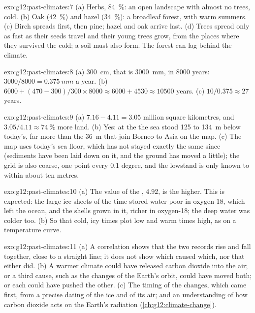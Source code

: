 \begin{solution}{exo:g12:past-climates:7}
(a) Herbs, \qty{84}{\percent}: an open landscape with almost no trees, cold.
(b) Oak (\qty{42}{\percent}) and hazel (\qty{34}{\percent}): a broadleaf
forest, with warm summers. (c) Birch spreads first, then pine; hazel and oak
arrive last. (d) Trees spread only as fast as their seeds travel and their
young trees grow, from the places where they survived the cold; a soil must
also form. The forest can lag behind the climate.
\end{solution}

\begin{solution}{exo:g12:past-climates:8}
(a) \qty{300}{cm}, that is \qty{3000}{mm}, in \num{8000} years: $3000/8000 =
\qty{0.375}{mm}$ a year. (b) $\num{6000} + (470 - 300)/300 \times \num{8000}
\approx \num{6000} + \num{4530} \approx \num{10500}$ years. (c) $10/0.375
\approx 27$ years.
\end{solution}

\begin{solution}{exo:g12:past-climates:9}
(a) $7.16 - 4.11 = 3.05$ million square kilometres, and $3.05/4.11 \approx
\qty{74}{\percent}$ more land. (b) Yes: at the  the sea
stood 125 to \qty{134}{m} below today's, far more than the \qty{36}{m}
that join Borneo to Asia on the map. (c) The map uses today's sea floor, which has not
stayed exactly the same since (sediments have been laid down on it, and the
ground has moved a little); the grid is also coarse, one point every 0.1
degree, and the lowstand is only known to within about ten metres.
\end{solution}

\begin{solution}{exo:g12:past-climates:10}
(a) The value of the , \qty{4.92}{\permil}, is the
higher. This is expected: the large ice sheets of the time stored water poor
in oxygen-18, which left the ocean, and the shells grown in it, richer in
oxygen-18; the deep water was colder too. (b) So that cold, icy times plot
low and warm times high, as on a temperature curve.
\end{solution}

\begin{solution}{exo:g12:past-climates:11}
(a) A correlation shows that the two records rise and fall together, close
to a straight line; it does not show which caused which, nor that either
did. (b) A warmer climate could have released carbon dioxide into the air;
or a third cause, such as the changes of the Earth's orbit, could have moved
both; or each could have pushed the other. (c) The timing of the changes,
which came first, from a precise dating of the ice and of its air; and an
understanding of how carbon dioxide acts on the Earth's radiation
(\cref{ch:g12:climate-change}).
\end{solution}

